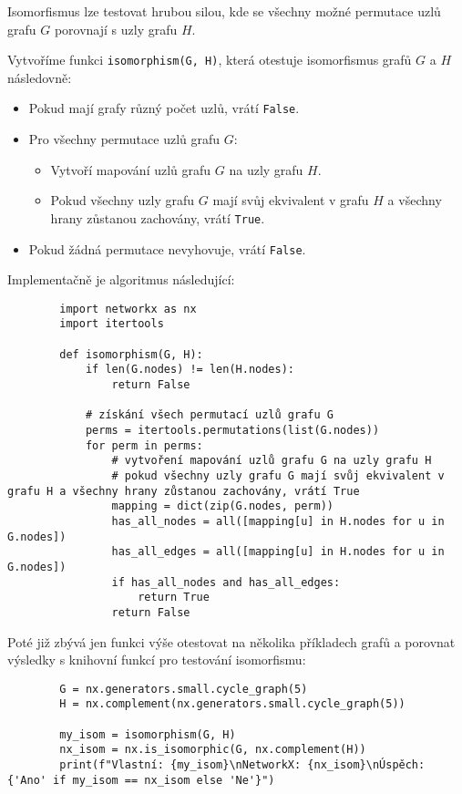 \documentclass[10pt, a4paper]{ReportSheet}
\begin{document}
    Isomorfismus lze testovat hrubou silou, kde se všechny možné permutace uzlů grafu $G$ porovnají s uzly grafu $H$.

    Vytvoříme funkci \texttt{isomorphism(G, H)}, která otestuje isomorfismus grafů $G$ a $H$ následovně:
    \begin{itemize}
        \item Pokud mají grafy různý počet uzlů, vrátí \texttt{False}.
        \item Pro všechny permutace uzlů grafu $G$:
        \begin{itemize}
            \item Vytvoří mapování uzlů grafu $G$ na uzly grafu $H$.
            \item Pokud všechny uzly grafu $G$ mají svůj ekvivalent v grafu $H$ a všechny hrany zůstanou zachovány, vrátí \texttt{True}.
        \end{itemize}
        \item Pokud žádná permutace nevyhovuje, vrátí \texttt{False}.
    \end{itemize}

    Implementačně je algoritmus následující:
    \begin{verbatim}
        import networkx as nx
        import itertools

        def isomorphism(G, H):
            if len(G.nodes) != len(H.nodes):
                return False

            # získání všech permutací uzlů grafu G
            perms = itertools.permutations(list(G.nodes))
            for perm in perms:
                # vytvoření mapování uzlů grafu G na uzly grafu H
                # pokud všechny uzly grafu G mají svůj ekvivalent v grafu H a všechny hrany zůstanou zachovány, vrátí True
                mapping = dict(zip(G.nodes, perm))
                has_all_nodes = all([mapping[u] in H.nodes for u in G.nodes])
                has_all_edges = all([mapping[u] in H.nodes for u in G.nodes])
                if has_all_nodes and has_all_edges:
                    return True
                return False
    \end{verbatim}

    Poté již zbývá jen funkci výše otestovat na několika příkladech grafů a porovnat výsledky s knihovní funkcí pro
    testování isomorfismu:
    \begin{verbatim}
        G = nx.generators.small.cycle_graph(5)
        H = nx.complement(nx.generators.small.cycle_graph(5))

        my_isom = isomorphism(G, H)
        nx_isom = nx.is_isomorphic(G, nx.complement(H))
        print(f"Vlastní: {my_isom}\nNetworkX: {nx_isom}\nÚspěch: {'Ano' if my_isom == nx_isom else 'Ne'}")
    \end{verbatim}
\end{document}
